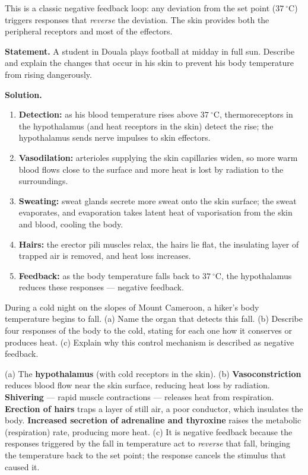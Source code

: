 \documentclass[11pt]{article}
\newcommand{\cle}[1]{{\popxbold\color{popdark}#1}}
\begin{document}
This is a classic \cle{negative feedback} loop: any deviation from the set point ($37\ ^\circ\mathrm{C}$) triggers responses that \emph{reverse} the deviation. The skin provides both the peripheral receptors and most of the effectors.

\begin{exoresolu}
\textbf{Statement.} A student in Douala plays football at midday in full sun. Describe and explain the changes that occur in his skin to prevent his body temperature from rising dangerously.

\tcblower
\textbf{Solution.}
\begin{enumerate}
\item \textbf{Detection:} as his blood temperature rises above $37\ ^\circ\mathrm{C}$, thermoreceptors in the hypothalamus (and heat receptors in the skin) detect the rise; the hypothalamus sends nerve impulses to skin effectors.
\item \textbf{Vasodilation:} arterioles supplying the skin capillaries widen, so more warm blood flows close to the surface and more heat is lost by radiation to the surroundings.
\item \textbf{Sweating:} sweat glands secrete more sweat onto the skin surface; the sweat evaporates, and evaporation takes latent heat of vaporisation from the skin and blood, cooling the body.
\item \textbf{Hairs:} the erector pili muscles relax, the hairs lie flat, the insulating layer of trapped air is removed, and heat loss increases.
\item \textbf{Feedback:} as the body temperature falls back to $37\ ^\circ\mathrm{C}$, the hypothalamus reduces these responses — negative feedback.
\end{enumerate}
\end{exoresolu}

\begin{exercice}
During a cold night on the slopes of Mount Cameroon, a hiker's body temperature begins to fall. (a) Name the organ that detects this fall. (b) Describe four responses of the body to the cold, stating for each one how it conserves or produces heat. (c) Explain why this control mechanism is described as negative feedback.
\end{exercice}

\begin{corrige}[Exercise 1]
(a) The \textbf{hypothalamus} (with cold receptors in the skin).
(b) \textbf{Vasoconstriction} reduces blood flow near the skin surface, reducing heat loss by radiation. \textbf{Shivering} — rapid muscle contractions — releases heat from respiration. \textbf{Erection of hairs} traps a layer of still air, a poor conductor, which insulates the body. \textbf{Increased secretion of adrenaline and thyroxine} raises the metabolic (respiration) rate, producing more heat.
(c) It is negative feedback because the responses triggered by the fall in temperature act to \emph{reverse} that fall, bringing the temperature back to the set point; the response cancels the stimulus that caused it.
\end{corrige}
\end{document}
